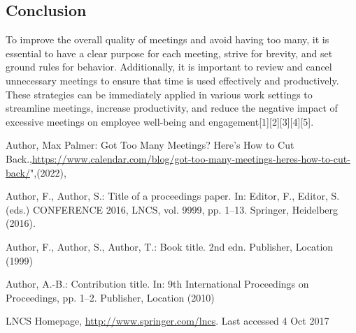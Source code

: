 \documentclass[runningheads]{llncs}
\begin{document}
\subsection{Conclusion}
To improve the overall quality of meetings and avoid having too many, it is essential to have a clear purpose for each meeting, strive for brevity, and set ground rules for behavior. Additionally, it is important to review and cancel unnecessary meetings to ensure that time is used effectively and productively.\\

These strategies can be immediately applied in various work settings to streamline meetings, increase productivity, and reduce the negative impact of excessive meetings on employee well-being and engagement[1][2][3][4][5].

%
%
%
% 
% 
%
\begin{thebibliography}{8}
Author, Max Palmer: Got Too Many Meetings? Here’s How to Cut Back.,\url{https://www.calendar.com/blog/got-too-many-meetings-heres-how-to-cut-back/}",(2022), 


Author, F., Author, S.: Title of a proceedings paper. In: Editor,
F., Editor, S. (eds.) CONFERENCE 2016, LNCS, vol. 9999, pp. 1--13.
Springer, Heidelberg (2016). 

Author, F., Author, S., Author, T.: Book title. 2nd edn. Publisher,
Location (1999)

Author, A.-B.: Contribution title. In: 9th International Proceedings
on Proceedings, pp. 1--2. Publisher, Location (2010)

LNCS Homepage, \url{http://www.springer.com/lncs}. Last accessed 4
Oct 2017
\end{thebibliography}
\end{document}

